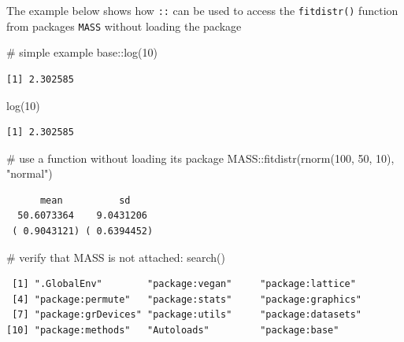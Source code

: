 \documentclass[
  13,
  letterpaper,
]{report}
\newenvironment{Shaded}{\begin{snugshade}}{\end{snugshade}}
\newcommand{\CommentTok}[1]{\textcolor[rgb]{0.37,0.37,0.37}{#1}}
\newcommand{\DecValTok}[1]{\textcolor[rgb]{0.68,0.00,0.00}{#1}}
\newcommand{\FunctionTok}[1]{\textcolor[rgb]{0.28,0.35,0.67}{#1}}
\newcommand{\NormalTok}[1]{\textcolor[rgb]{0.00,0.23,0.31}{#1}}
\newcommand{\SpecialCharTok}[1]{\textcolor[rgb]{0.37,0.37,0.37}{#1}}
\newcommand{\StringTok}[1]{\textcolor[rgb]{0.13,0.47,0.30}{#1}}
\begin{document}
The example below shows how \texttt{::} can be used to access the
\texttt{fitdistr()} function from packages \texttt{MASS} without loading
the package

\begin{Shaded}
\begin{Highlighting}[]
\CommentTok{\# simple example}
\NormalTok{base}\SpecialCharTok{::}\FunctionTok{log}\NormalTok{(}\DecValTok{10}\NormalTok{)}
\end{Highlighting}
\end{Shaded}

\begin{verbatim}
[1] 2.302585
\end{verbatim}

\begin{Shaded}
\begin{Highlighting}[]
\FunctionTok{log}\NormalTok{(}\DecValTok{10}\NormalTok{)}
\end{Highlighting}
\end{Shaded}

\begin{verbatim}
[1] 2.302585
\end{verbatim}

\begin{Shaded}
\begin{Highlighting}[]
\CommentTok{\# use a function without loading its package}
\NormalTok{MASS}\SpecialCharTok{::}\FunctionTok{fitdistr}\NormalTok{(}\FunctionTok{rnorm}\NormalTok{(}\DecValTok{100}\NormalTok{, }\DecValTok{50}\NormalTok{, }\DecValTok{10}\NormalTok{), }\StringTok{"normal"}\NormalTok{)}
\end{Highlighting}
\end{Shaded}

\begin{verbatim}
      mean          sd    
  50.6073364    9.0431206 
 ( 0.9043121) ( 0.6394452)
\end{verbatim}

\begin{Shaded}
\begin{Highlighting}[]
\CommentTok{\# verify that MASS is not attached:}
\FunctionTok{search}\NormalTok{()}
\end{Highlighting}
\end{Shaded}

\begin{verbatim}
 [1] ".GlobalEnv"        "package:vegan"     "package:lattice"  
 [4] "package:permute"   "package:stats"     "package:graphics" 
 [7] "package:grDevices" "package:utils"     "package:datasets" 
[10] "package:methods"   "Autoloads"         "package:base"     
\end{verbatim}
\end{document}
